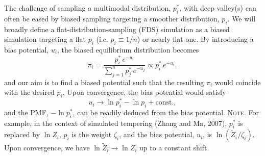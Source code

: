 \documentclass[reprint, superscriptaddress, floatfix]{revtex4-1}
\newcommand{\note}[1]{{\color{DarkGreen}\footnotesize \textsc{Note.} #1}}
\begin{document}
%
The challenge of sampling a multimodal distribution, $p^*_i$,
with deep valley(s) can often be eased by
biased sampling targeting a smoother distribution, $p_i$.
%
%
%
%
We will broadly define
a flat-distribution-sampling (FDS) simulation
as a biased simulation
targeting a flat $p_i$ (i.e. $p_i \equiv 1/n$)
or nearly flat one\cite{
dayal2004, *trebst2004, barducci2008, singh2011}.
%
By introducing a bias potential, $u_i$,
the biased equilibrium distribution becomes
%
\begin{equation}
  \pi_i
  =
  \frac{                p^*_i \, e^{-u_i} }
       { \sum_{j = 1}^n p^*_j \, e^{-u_j} }
  \propto
  p^*_i \, e^{-u_i}
  ,
  \label{eq:pi_p_V}
\end{equation}
%
and our aim is to find a biased potential
such that the resulting $\pi_i$ would coincide
with the desired $p_i$.
%
Upon convergence, the bias potential would satisfy
%
\begin{equation}
  u_i \to \ln p^*_i - \ln p_i + \mathrm{const.}
  ,
  \label{eq:Vi_target}
\end{equation}
%
%
and the PMF, $-\ln p^*_i$, can be readily
deduced from the bias potential. %
\note{
  For example, in the context of simulated tempering (Zhang and Ma, 2007),
  $p^*_i$ is replaced by $\ln Z_i$,
  $p_i$ is the weight $\zeta_i$,
  and the bias potential, $u_i$, is $\ln (\tilde Z_i / \zeta_i)$.
  Upon convergence, we have $\ln \tilde Z_i \to \ln Z_i$
  up to a constant shift.
}
\end{document}

